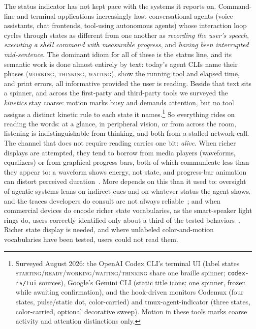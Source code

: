 \documentclass[11pt]{article}
\begin{document}
The status indicator has not kept pace with the systems it reports on.
Command-line and terminal applications increasingly host conversational agents (voice assistants, chat frontends, tool-using autonomous agents) whose interaction loop cycles through states as different from one
another as \emph{recording the user's speech}, \emph{executing a shell
command with measurable progress}, and \emph{having been interrupted
mid-sentence}. The dominant idiom for all of these is the status line, and its
semantic work is done almost entirely by text: today's agent CLIs name
their phases (\textsc{working}, \textsc{thinking}, \textsc{waiting}),
show the running tool and elapsed time, and print errors, all informative provided the user is reading. Beside that text sits a spinner, and across the first-party and third-party tools we surveyed
the \emph{kinetics} stay coarse: motion
marks busy and demands attention, but no tool assigns a distinct kinetic
rule to each state it names.\footnote{Surveyed
August 2026: the OpenAI Codex CLI's terminal UI (label states
\textsc{starting}/\textsc{ready}/\textsc{working}/\textsc{waiting}/\textsc{thinking}
share one braille spinner; \texttt{codex-rs/tui} sources), Google's
Gemini CLI (static title icons; one spinner, frozen while awaiting
confirmation), and the hook-driven monitors Codemux (four states,
pulse/static dot, color-carried) and tmux-agent-indicator (three states,
color-carried, optional decorative sweep). Motion in these tools marks
coarse activity and attention distinctions only.} So everything rides on reading the words: at a glance, in
peripheral vision, or from across the room, listening is indistinguishable from thinking, and both from a stalled network call. The channel that does not
require reading carries one bit: \emph{alive}. When richer displays
are attempted, they tend to
borrow from media players (waveforms, equalizers) or from graphical
progress bars, both of which communicate less than they appear to: a
waveform shows energy, not state, and progress-bar animation can distort
perceived duration~\cite{harrison2007}. More depends on this than it used to: oversight of agentic systems leans on indirect cues and on whatever status the agent shows, and the traces developers
do consult are not always reliable~\cite{dhanorkar2026}; and when commercial
devices do encode richer state vocabularies, as the smart-speaker light rings do, users correctly identified only about a third of the tested
behaviors~\cite{kunchay2021}. Richer state display is needed, and where unlabeled color-and-motion vocabularies have been tested, users could not read them.
\end{document}
